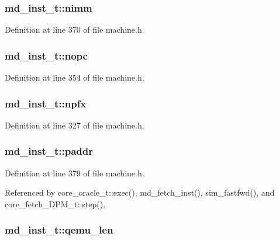 \subsubsection[{nimm}]{ {\bf md\_\-inst\_\-t::nimm}}\label{structmd__inst__t_6fc5250471ae53bb67d84dabe712ed97}




Definition at line 370 of file machine.h.
\subsubsection[{nopc}]{ {\bf md\_\-inst\_\-t::nopc}}\label{structmd__inst__t_a2a65398bdd14775f80dcf8ef7f13387}




Definition at line 354 of file machine.h.
\subsubsection[{npfx}]{ {\bf md\_\-inst\_\-t::npfx}}\label{structmd__inst__t_3bc85e42f8eab1d43542667ac907504d}




Definition at line 327 of file machine.h.
\subsubsection[{paddr}]{ {\bf md\_\-inst\_\-t::paddr}}\label{structmd__inst__t_e05730869a364bf93b640941f78113ab}




Definition at line 379 of file machine.h.

Referenced by core\_\-oracle\_\-t::exec(), md\_\-fetch\_\-inst(), sim\_\-fastfwd(), and core\_\-fetch\_\-DPM\_\-t::step().
\subsubsection[{qemu\_\-len}]{ {\bf md\_\-inst\_\-t::qemu\_\-len}}\label{structmd__inst__t_d7a24ed96b5a93217bf1cbd39c2bb859}




